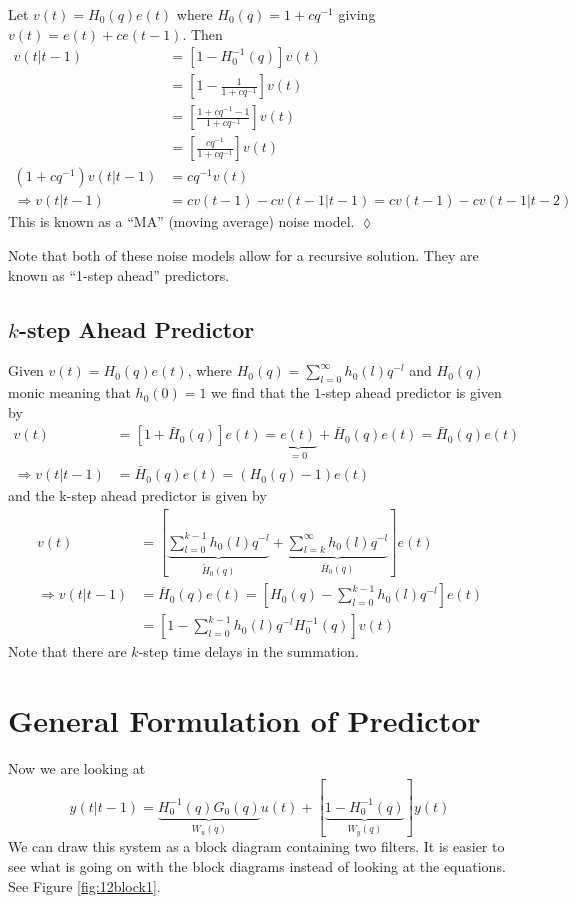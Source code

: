 \begin{example}
Let $v(t)=H_0(q)e(t)$ where $H_0(q)=1+cq^{-1}$ giving $v(t)=e(t)+ce(t-1)$. Then
\begin{align*}
v(t|t-1) &= [1-H_0^{-1}(q)]v(t) \\
&= \left[1-\frac{1}{1+cq^{-1}}\right]v(t) \\
&= \left[\frac{1+cq^{-1}-1}{1+cq^{-1}}\right]v(t) \\
&= \left[\frac{cq^{-1}}{1+cq^{-1}}\right]v(t) \\
(1+cq^{-1})v(t|t-1) &= cq^{-1}v(t) \\
\Rightarrow v(t|t-1) &= cv(t-1)-cv(t-1|t-1) = cv(t-1)-cv(t-1|t-2)
\end{align*}
This is known as a ``MA'' (moving average) noise model.
$\lozenge$
\end{example}

Note that both of these noise models allow for a recursive solution. They are known as ``1-step ahead'' predictors.

\subsection{$k$-step Ahead Predictor}
Given $v(t)=H_0(q)e(t)$, where $H_0(q)=\sum_{l=0}^\infty h_0(l)q^{-l}$ and $H_0(q)$ monic meaning that $h_0(0)=1$ we find that the $1$-step ahead predictor is given by
\begin{align*}
v(t) &= [1+\bar{H}_0(q)]e(t) = \underbrace{e(t)}_{=0}+\bar{H}_0(q)e(t) = \bar{H}_0(q)e(t) \\
\Rightarrow v(t|t-1) &= \bar{H}_0(q)e(t) = (H_0(q)-1)e(t)
\end{align*}
and the k-step ahead predictor is given by
\begin{align*}
v(t) &= \left[\underbrace{\sum_{l=0}^{k-1}h_0(l)q^{-l}}_{\tilde{H}_0(q)} + \underbrace{\sum_{l=k}^\infty h_0(l)q^{-l}}_{\bar{H}_0(q)}\right]e(t) \\
\Rightarrow v(t|t-1) &= \bar{H}_0(q)e(t) = \left[H_0(q)-\sum_{l=0}^{k-1}h_0(l)q^{-l}\right]e(t) \\
&= \left[1-\sum_{l=0}^{k-1}h_0(l)q^{-l}H_0^{-1}(q)\right]v(t)
\end{align*}
Note that there are $k$-step time delays in the summation.

\section{General Formulation of Predictor}
Now we are looking at
$$y(t|t-1) = \underbrace{H_0^{-1}(q)G_0(q)}_{W_u(q)}u(t) + [\underbrace{1-H_0^{-1}(q)}_{W_y(q)}]y(t)$$
We can draw this system as a block diagram containing two filters. It is easier to see what is going on with the block diagrams instead of looking at the equations. See Figure \ref{fig:12block1}.

